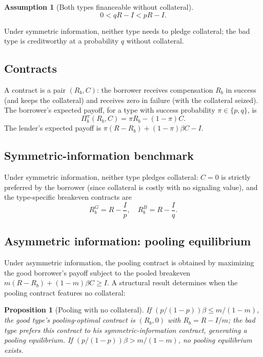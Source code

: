 \documentclass[11pt,a4paper,oneside]{book}
\def\leq{\leqslant}
\def\geq{\geqslant}
\theoremstyle{plain}
\newtheorem{proposition}[theorem]{Proposition}
\theoremstyle{definition}
\newtheorem{assumption}[theorem]{Assumption}
\theoremstyle{remark}
\numberwithin{equation}{chapter}
\begin{document}
\begin{assumption}[Both types financeable without collateral]\label{ass:diss-coll-viable}
\begin{equation*}
  0 < q R - I < p R - I.
\end{equation*}
\end{assumption}

Under symmetric information, neither type needs to pledge collateral; the bad type is creditworthy at a probability $q$ without collateral.

\subsection{Contracts}

A contract is a pair $(R_b, C)$: the borrower receives compensation $R_b$ in success (and keeps the collateral) and receives zero in failure (with the collateral seized).
The borrower's expected payoff, for a type with success probability $\pi \in \{p, q\}$, is
\begin{equation*}
  \Pi_b^\pi(R_b, C) = \pi R_b - (1 - \pi) C.
\end{equation*}
The lender's expected payoff is $\pi(R - R_b) + (1 - \pi) \beta C - I$.

\subsection{Symmetric-information benchmark}

Under symmetric information, neither type pledges collateral: $C = 0$ is strictly preferred by the borrower (since collateral is costly with no signaling value), and the type-specific breakeven contracts are
\begin{equation*}
  R_b^{G} = R - \frac{I}{p},
  \quad
  R_b^{B} = R - \frac{I}{q}.
\end{equation*}

\subsection{Asymmetric information: pooling equilibrium}

Under asymmetric information, the pooling contract is obtained by maximizing the good borrower's payoff subject to the pooled breakeven $m(R - R_b) + (1 - m) \beta C \geq I$.
A structural result determines when the pooling contract features no collateral:

\begin{proposition}[Pooling with no collateral]\label{prop:diss-coll-pool-nocoll}
If $(p/(1-p)) \beta \leq m/(1-m)$, the good type's pooling-optimal contract is $(R_b, 0)$ with $R_b = R - I/m$; the bad type prefers this contract to his symmetric-information contract, generating a pooling equilibrium.
If $(p/(1-p)) \beta > m/(1-m)$, no pooling equilibrium exists.
\end{proposition}
\end{document}
